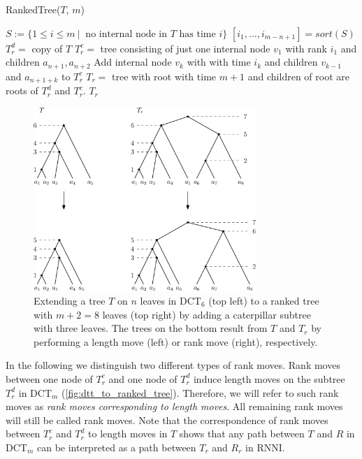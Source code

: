 \documentclass[11pt]{amsart}
\newcommand{\rnni}{\mathrm{RNNI}}
\newcommand{\dtt}{\mathrm{DCT}}
\newcommand{\summary}[1]{} %
\begin{document}
\begin{algorithm}[ht]
	\caption{RankedTree($T$, $m$)}
	\label{alg:ranked_tree}
	\begin{algorithmic}[1]
		\STATE $S:= \{1 \leq i \leq m \ |\  \text{ no internal node in } T \text{ has time } i\}$
		\STATE $[i_1, \ldots, i_{m-n+1}] = sort(S)$
		\STATE $T_r^d =$ copy of $T$
		\STATE $T_r^c =$ tree consisting of just one internal node $v_1$ with rank $i_1$ and children $a_{n+1}, a_{n+2}$
			\STATE Add internal node $v_k$ with with time $i_k$ and children $v_{k-1}$ and $a_{n+1+k}$ to $T_r^c$
		\ENDFOR
		\STATE $T_r = $ tree with root with time $m+1$ and children of root are roots of $T_r^d$ and $T_r^c$.
		\RETURN $T_r$
	\end{algorithmic}
\end{algorithm}

\begin{figure}[ht]
	\includegraphics[width=0.75\textwidth]{dtt_to_ranked_tree.eps}
	\caption{Extending a tree $T$ on $n$ leaves in $\dtt_6$ (top left) to a ranked tree with $m+2=8$ leaves (top right) by adding a caterpillar subtree with three leaves.
	The trees on the bottom result from $T$ and $T_r$ by performing a length move (left) or rank move (right), respectively.}
	\label{fig:dtt_to_ranked_tree}
\end{figure}

\summary{Moves on the extended ranked versions of trees -- $\rnni$ vs length moves}
In the following we distinguish two different types of rank moves.
Rank moves between one node of $T_r^c$ and one node of $T_r^d$ induce length moves on the subtree $T_r^d$ in $\dtt_m$ (\autoref{fig:dtt_to_ranked_tree}).
Therefore, we will refer to such rank moves as \emph{rank moves corresponding to length moves}.
All remaining rank moves will still be called rank moves.
Note that the correspondence of rank moves between $T_r^c$ and $T_r^d$ to length moves in $T$ shows that any path between $T$ and $R$ in $\dtt_m$ can be interpreted as a path between $T_r$ and $R_r$ in $\rnni$.
\end{document}
